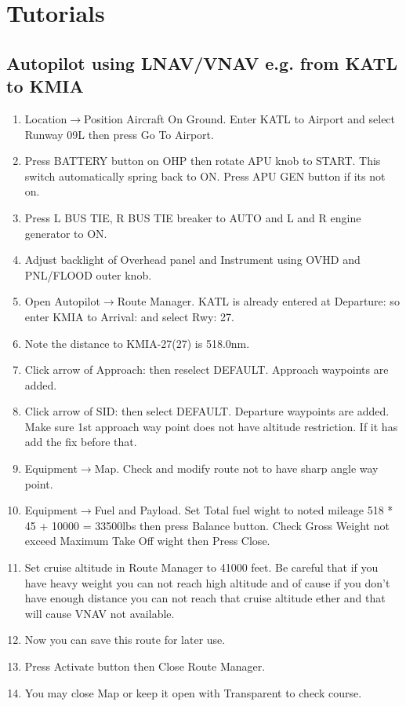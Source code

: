 \section{Tutorials} %
\subsection{Autopilot using LNAV/VNAV e.g. from KATL to KMIA}
\begin{enumerate}
\item Location$\rightarrow$Position Aircraft On Ground. Enter KATL to Airport and select Runway 09L then press Go To Airport.
\item Press BATTERY button on OHP then rotate APU knob to START. This switch automatically spring back to ON. Press APU GEN button if its not on.
\item Press L BUS TIE, R BUS TIE breaker to AUTO and L and R engine generator to ON.
\item Adjust backlight of Overhead panel and Instrument using OVHD and PNL/FLOOD outer knob.
\item Open Autopilot$\rightarrow$Route Manager. KATL is already entered at Departure: so enter KMIA to Arrival: and select Rwy: 27.
\item Note the distance to KMIA-27(27) is 518.0nm.
\item Click arrow of Approach: then reselect DEFAULT. Approach waypoints are added.
\item Click arrow of SID: then select DEFAULT. Departure waypoints are added. Make sure 1st approach way point does not have altitude restriction. If it has add the fix before that.
\item Equipment$\rightarrow$Map. Check and modify route not to have sharp angle way point.
\item Equipment$\rightarrow$Fuel and Payload. Set Total fuel wight to noted mileage 518 * 45 + 10000 = 33500lbs then press Balance button. Check Gross Weight not exceed Maximum Take Off wight then Press Close.
\item Set cruise altitude in Route Manager to 41000 feet. Be careful that if you have heavy weight you can not reach high altitude and of cause if you don't have enough distance you can not reach that cruise altitude ether and that will cause VNAV not available.
\item Now you can save this route for later use.
\item Press Activate button then Close Route Manager.
\item You may close Map or keep it open with Transparent to check course.

\end{enumerate}

